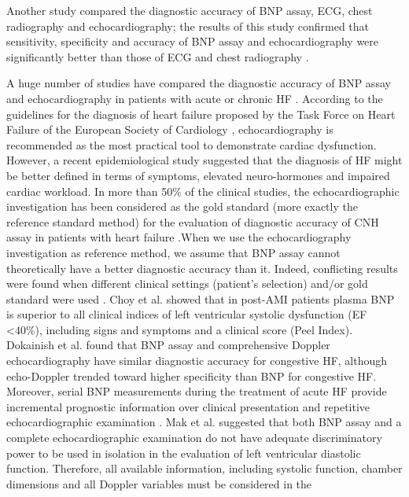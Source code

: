 \documentclass[14pt,a4paper,onecolumn]{extarticle}
\begin{document}
Another study \citep{bib3170} compared the diagnostic accuracy of BNP assay, ECG, chest
radiography and echocardiography; the results of this study confirmed that sensitivity, specificity and accuracy of BNP assay and echocardiography were significantly better than those of ECG and chest radiography \citep{bib3170}.

A huge number of studies have compared the diagnostic accuracy of BNP assay and
echocardiography in patients with acute or chronic HF \citep{bib35} \citep{bib362} \citep{bib363} \citep{bib364} \citep{bib365} \citep{bib372} \citep{bib3175}. According to
the guidelines for the diagnosis of heart failure proposed by the Task Force on Heart Failure of the European Society of Cardiology \citep{bib369}, echocardiography is recommended as
the most practical tool to demonstrate cardiac dysfunction. However, a recent epidemiological study \citep{bib3176} suggested that the diagnosis of HF might be better defined
in terms of symptoms, elevated neuro-hormones and impaired cardiac workload.
In more than 50\% of the clinical studies, the echocardiographic investigation has
been considered as the gold standard (more exactly the reference standard method)
for the evaluation of diagnostic accuracy of CNH assay in patients with heart failure
\citep{bib35} \citep{bib372}.When we use the echocardiography investigation as reference method, we assume
that BNP assay cannot theoretically have a better diagnostic accuracy than it. Indeed,
conflicting results were found when different clinical settings (patient’s selection) and/or
gold standard were used \citep{bib35} \citep{bib372}. Choy et al. \citep{bib3177} showed that in post-AMI patients
plasma BNP is superior to all clinical indices of left ventricular systolic dysfunction
(EF <40\%), including signs and symptoms and a clinical score (Peel Index). Dokainish
et al. \citep{bib3178} found that BNP assay and comprehensive Doppler echocardiography have
similar diagnostic accuracy for congestive HF, although echo-Doppler trended toward
higher specificity than BNP for congestive HF. Moreover, serial BNP measurements
during the treatment of acute HF provide incremental prognostic information over
clinical presentation and repetitive echocardiographic examination \citep{bib3179}. Mak et al.
\citep{bib3180} suggested that both BNP assay and a complete echocardiographic examination do
not have adequate discriminatory power to be used in isolation in the evaluation of left
ventricular diastolic function. Therefore, all available information, including systolic
function, chamber dimensions and all Doppler variables must be considered in the
\end{document}
